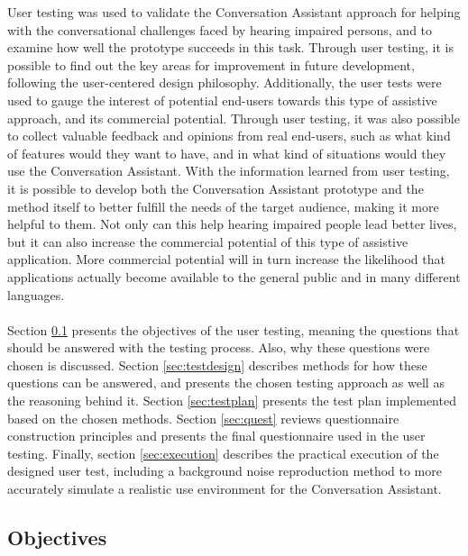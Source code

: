 \documentclass[english, 12pt, a4paper, pdftex, elec, utf8]{aaltothesis}
\begin{document}
User testing was used to validate the Conversation Assistant approach for helping with the conversational challenges faced by hearing impaired persons, and to examine how well the prototype succeeds in this task. Through user testing, it is possible to find out the key areas for improvement in future development, following the user-centered design philosophy. Additionally, the user tests were used to gauge the interest of potential end-users towards this type of assistive approach, and its commercial potential. Through user testing, it was also possible to collect valuable feedback and opinions from real end-users, such as what kind of features would they want to have, and in what kind of situations would they use the Conversation Assistant. With the information learned from user testing, it is possible to develop both the Conversation Assistant prototype and the method itself  to better fulfill the needs of the target audience, making it more helpful to them. Not only can this help hearing impaired people lead better lives, but it can also increase the commercial potential of this type of assistive application. More commercial potential will in turn increase the likelihood that applications actually become available to the general public and in many different languages. \\\\
Section \ref{sec:objectives} presents the objectives of the user testing, meaning the questions that should be answered with the testing process. Also, why these questions were chosen is discussed. Section \ref{sec:testdesign} describes methods for how these questions can be answered, and presents the chosen testing approach as well as the reasoning behind it. Section \ref{sec:testplan} presents the test plan implemented based on the chosen methods. Section \ref{sec:quest} reviews questionnaire construction principles and presents the final questionnaire used in the user testing. Finally, section \ref{sec:execution} describes the practical execution of the designed user test, including a background noise reproduction method to more accurately simulate a realistic use environment for the Conversation Assistant.
 
\subsection{Objectives} \label{sec:objectives}
\end{document}
